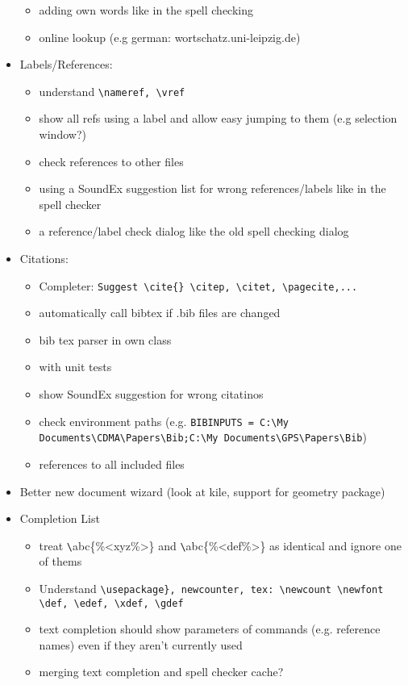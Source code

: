 \documentclass[10pt,a4paper,landscape]{report}
\begin{document}
\begin{itemize}
\begin{itemize}
		\item adding own words like in the spell checking 
		\item online lookup (e.g german: wortschatz.uni-leipzig.de)
	\end{itemize}
	\item Labels/References: \begin{itemize}
		\item understand \verb+\nameref, \vref+
		\item 	show all refs using a label and allow easy jumping to them (e.g selection window?)
		\item check references to other files
		\item using a SoundEx suggestion list for wrong references/labels like in the spell checker
		\item a reference/label check dialog like the old spell checking dialog
	\end{itemize}
	\item Citations: \begin{itemize}
		\item Completer: \verb+Suggest \cite{} \citep, \citet, \pagecite,...+
		\item automatically call bibtex if .bib files are changed
		\item bib tex parser in own class
		\item with unit tests
		\item show SoundEx suggestion for wrong citatinos
		\item check environment paths (e.g. \verb+BIBINPUTS = C:\My Documents\CDMA\Papers\Bib;C:\My Documents\GPS\Papers\Bib+)
		\item references to all included files
	\end{itemize}
	\item Better new document wizard (look at kile, support for geometry package)
	\item Completion List \begin{itemize}
		\item treat \verb+\+abc\{\%<xyz\%>\} and \verb+\+abc\{\%<def\%>\} as identical and ignore one of thems
		\item Understand \verb+\usepackage}, newcounter, tex: \newcount \newfont \def, \edef, \xdef, \gdef+
		\item text completion should show parameters of commands (e.g. reference names) even if they aren't currently used
		\item merging text completion and spell checker cache?

\end{itemize}
\end{itemize}
\end{document}

